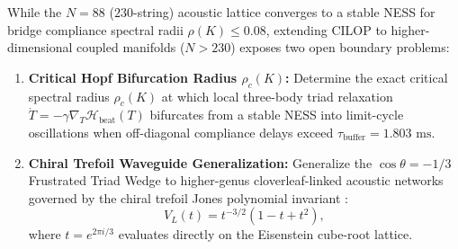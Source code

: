 \documentclass[aps,prl,twocolumn,superscriptaddress,10pt]{revtex4-2}
\begin{document}
While the $N=88$ ($230$-string) acoustic lattice converges to a stable NESS for bridge compliance spectral radii $\rho(K) \le 0.08$, extending CILOP to higher-dimensional coupled manifolds ($N > 230$) exposes two open boundary problems:
\begin{enumerate}
\item \textbf{Critical Hopf Bifurcation Radius $\rho_c(K)$:} Determine the exact critical spectral radius $\rho_c(K)$ at which local three-body triad relaxation $\dot{T} = -\gamma \nabla_T \mathcal{H}_{\text{beat}}(T)$ bifurcates from a stable NESS into limit-cycle oscillations when off-diagonal compliance delays exceed $\tau_{\text{buffer}} = 1.803\text{ ms}$.
\item \textbf{Chiral Trefoil Waveguide Generalization:} Generalize the $\cos\theta = -1/3$ Frustrated Triad Wedge to higher-genus cloverleaf-linked acoustic networks governed by the chiral trefoil Jones polynomial invariant \cite{Jones1985}:
\begin{equation}
V_L(t) = t^{-3/2} \left(1 - t + t^2\right),
\label{eq:jones_trefoil}
\end{equation}
where $t = e^{2\pi i / 3}$ evaluates directly on the Eisenstein cube-root lattice.
\end{enumerate}



\end{document}
